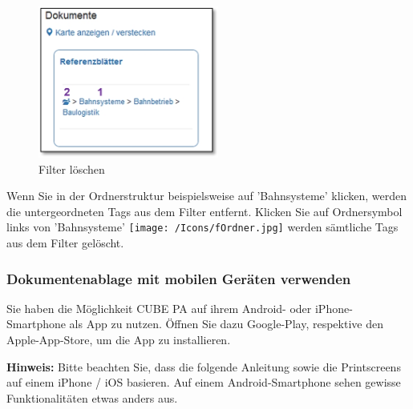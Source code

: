 \pagebreak

\begin{figure}   %
  \vspace{-30pt}      %
  \begin{center}
    \includegraphics[height=50mm]{../chapters/11_Dokumentenablage/pictures/11-htag_FilterLoeschen.jpg}
  \end{center}
  \vspace{-20pt}
  \caption{Filter löschen}
  \vspace{-10pt}
\end{figure}
Wenn Sie in der Ordnerstruktur beispielsweise auf 'Bahnsysteme'  klicken, werden die untergeordneten Tags aus dem Filter entfernt. Klicken Sie auf Ordnersymbol links von 'Bahnsysteme' \texttt{[image: /Icons/fOrdner.jpg]}  werden sämtliche Tags aus dem Filter gelöscht.

\vspace{\baselineskip}
\vspace{\baselineskip}
\vspace{\baselineskip}
\vspace{\baselineskip}

\subsubsection{Dokumentenablage mit mobilen Geräten verwenden}

Sie haben die Möglichkeit CUBE PA auf ihrem Android- oder iPhone-Smartphone als App zu nutzen. Öffnen Sie dazu Google-Play, respektive den Apple-App-Store, um die App zu installieren.

\vspace{\baselineskip}

\textbf{Hinweis:} Bitte beachten Sie, dass die folgende Anleitung sowie die Printscreens auf einem iPhone / iOS basieren. Auf einem Android-Smartphone sehen gewisse Funktionalitäten etwas anders aus.


